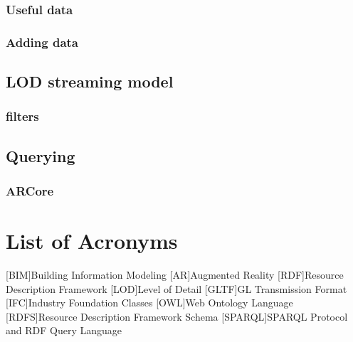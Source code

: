 \documentclass[12pt,a4paper,faculty=ea,language=en,doctype=report]{ugent-doc}
\begin{document}
    \subsection{Useful data}
    \subsection{Adding data}
  \section{LOD streaming model}  
    \subsection{filters}
  \section{Querying}    
    \subsection{ARCore}


% 
\clearpage
\chapter*{List of Acronyms}
\begin{acronym}[JSONP]\itemsep2pt\hypersetup{hidelinks}
  [BIM]{Building Information Modeling}
  [AR]{Augmented Reality}
  [RDF]{Resource Description Framework}
  [LOD]{Level of Detail}
  [GLTF]{GL Transmission Format}
  [IFC]{Industry Foundation Classes}
  [OWL]{Web Ontology Language}
  [RDFS]{Resource Description Framework Schema}
  [SPARQL]{SPARQL Protocol and RDF Query Language}
\end{acronym}

\printbibliography[heading=bibintoc,title={References}]
\end{document}
